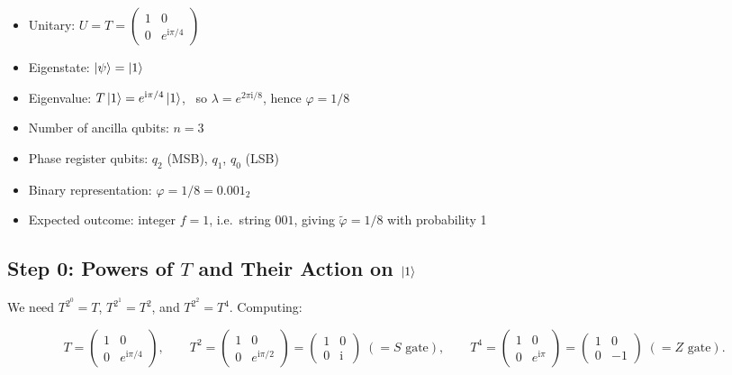 \documentclass[12pt,a4paper]{article}
\newcommand{\ii}{\mathrm{i}}
\begin{document}
\begin{tcolorbox}[example, title={Setup Recap}]
  \begin{itemize}[leftmargin=*]
    \item Unitary: $U = T = \begin{pmatrix}1&0\\0&e^{\ii\pi/4}\end{pmatrix}$
    \item Eigenstate: $\Ket{\psi} = \Ket{1}$
    \item Eigenvalue: $T\Ket{1} = e^{\ii\pi/4}\Ket{1}$, \
          so $\lambda = e^{2\pi\ii/8}$, hence $\varphi = 1/8$
    \item Number of ancilla qubits: $n = 3$
    \item Phase register qubits: $q_2$ (MSB), $q_1$, $q_0$ (LSB)
    \item Binary representation: $\varphi = 1/8 = 0.001_2$
    \item Expected outcome: integer $f=1$, i.e.\ string $001$,
          giving $\tilde\varphi = 1/8$ with probability 1
  \end{itemize}
\end{tcolorbox}

\subsection{Step 0: Powers of \texorpdfstring{$T$}{T} and Their Action on \texorpdfstring{$\Ket{1}$}{|1>}}

We need $T^{2^0} = T$, $T^{2^1} = T^2$, and $T^{2^2} = T^4$.  Computing:

\[
  T = \begin{pmatrix}1&0\\0&e^{\ii\pi/4}\end{pmatrix},
  \qquad
  T^2 = \begin{pmatrix}1&0\\0&e^{\ii\pi/2}\end{pmatrix}
       = \begin{pmatrix}1&0\\0&\ii\end{pmatrix}
       \;(= S \text{ gate}),
  \qquad
  T^4 = \begin{pmatrix}1&0\\0&e^{\ii\pi}\end{pmatrix}
       = \begin{pmatrix}1&0\\0&-1\end{pmatrix}
       \;(= Z \text{ gate}).
\]
\end{document}

